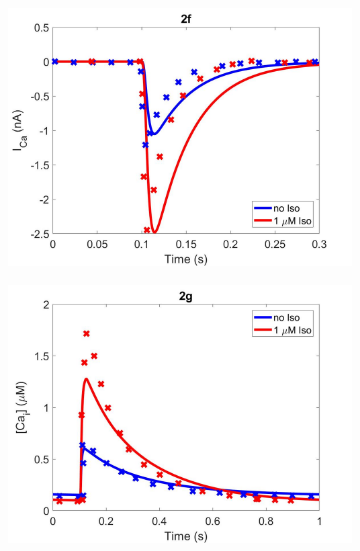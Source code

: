 \documentclass[fleqn,10pt]{physiome}
\begin{document}
\begin{figure}
\begin{subfigure}[b]{0.49\textwidth}
    \end{subfigure}
    \hfill
    \begin{subfigure}[b]{0.49\textwidth}
        \centering
        \includegraphics[width=\textwidth]{figures/F2f.jpg}
    \end{subfigure}
    \hfill
    \begin{subfigure}[b]{0.49\textwidth}
        \centering
        \includegraphics[width=\textwidth]{figures/F2g.jpg}
    \end{subfigure}
    \begin{subfigure}[b]{0.49\textwidth}
        \centering

\end{subfigure}
\end{figure}
\end{document}
